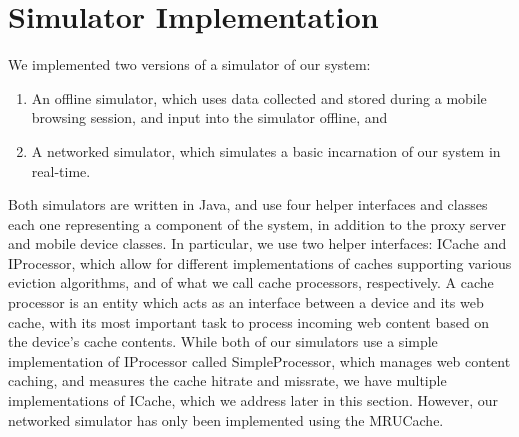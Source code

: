 \section{Simulator Implementation}
We implemented two versions of a simulator of our system: 
\begin{enumerate}
\item An offline simulator, which uses data collected and stored during a mobile browsing session, and input into the simulator offline, and
\item A networked simulator, which simulates a basic incarnation of our system in real-time.
\end{enumerate}
Both simulators are written in Java, and use four helper interfaces and classes each one representing a component of the system, in addition to the proxy server and mobile device classes. In particular, we use two helper interfaces: ICache and IProcessor, which allow for different implementations of caches supporting various eviction algorithms, and of what we call cache processors, respectively. A cache processor is an entity which acts as an interface between a device and its web cache, with its most important task to process incoming web content based on the device's cache contents. While both of our simulators use a simple implementation of IProcessor called SimpleProcessor, which manages web content caching, and measures the cache hitrate and missrate, we have multiple implementations of ICache, which we address later in this section. However, our networked simulator has only been implemented using the MRUCache.



